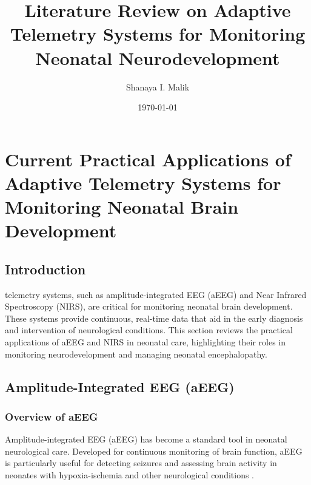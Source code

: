 \documentclass[12pt,journal,compsoc]{IEEEtran}
\begin{document}
\title{Literature Review on Adaptive Telemetry Systems for Monitoring Neonatal Neurodevelopment}
\author{Shanaya I. Malik}

\date{\today}

%


\maketitle


\section{Current Practical Applications of Adaptive Telemetry Systems for Monitoring Neonatal Brain Development}

\subsection{Introduction}
 telemetry systems, such as amplitude-integrated EEG (aEEG) and Near Infrared Spectroscopy (NIRS), are critical for monitoring neonatal brain development. These systems provide continuous, real-time data that aid in the early diagnosis and intervention of neurological conditions. This section reviews the practical applications of aEEG and NIRS in neonatal care, highlighting their roles in monitoring neurodevelopment and managing neonatal encephalopathy.

\subsection{Amplitude-Integrated EEG (aEEG)}

\subsubsection{Overview of aEEG}
Amplitude-integrated EEG (aEEG) has become a standard tool in neonatal neurological care. Developed for continuous monitoring of brain function, aEEG is particularly useful for detecting seizures and assessing brain activity in neonates with hypoxia-ischemia and other neurological conditions \cite{IEEEhowto:toet}.
\end{document}
